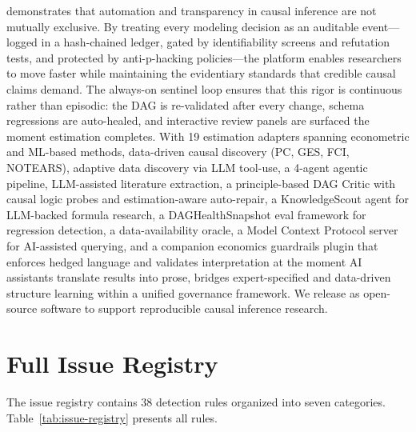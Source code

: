 \documentclass{article}
\begin{document}
\oc{} demonstrates that automation and transparency in causal inference are not mutually exclusive. By treating every modeling decision as an auditable event---logged in a hash-chained ledger, gated by identifiability screens and refutation tests, and protected by anti-p-hacking policies---the platform enables researchers to move faster while maintaining the evidentiary standards that credible causal claims demand. The always-on sentinel loop ensures that this rigor is continuous rather than episodic: the DAG is re-validated after every change, schema regressions are auto-healed, and interactive review panels are surfaced the moment estimation completes. With 19 estimation adapters spanning econometric and ML-based methods, data-driven causal discovery (PC, GES, FCI, NOTEARS), adaptive data discovery via LLM tool-use, a 4-agent agentic pipeline, LLM-assisted literature extraction, a principle-based DAG Critic with causal logic probes and estimation-aware auto-repair, a KnowledgeScout agent for LLM-backed formula research, a DAGHealthSnapshot eval framework for regression detection, a data-availability oracle, a Model Context Protocol server for AI-assisted querying, and a companion economics guardrails plugin that enforces hedged language and validates interpretation at the moment AI assistants translate results into prose, \oc{} bridges expert-specified and data-driven structure learning within a unified governance framework. We release \oc{} as open-source software to support reproducible causal inference research.




\appendix

\section{Full Issue Registry}
\label{app:issues}

The \oc{} issue registry contains 38 detection rules organized into seven categories. Table~\ref{tab:issue-registry} presents all rules.
\end{document}
